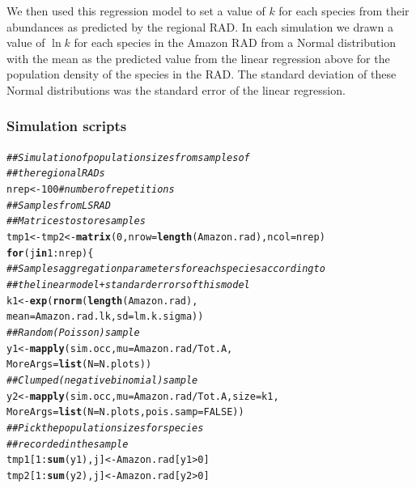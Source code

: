 \documentclass[12pt, A4]{article}\usepackage[]{graphicx}\usepackage[]{color}
\makeatletter
\newcommand{\hlnum}[1]{\textcolor[rgb]{0.686,0.059,0.569}{#1}}%
\newcommand{\hlcom}[1]{\textcolor[rgb]{0.678,0.584,0.686}{\textit{#1}}}%
\newcommand{\hlopt}[1]{\textcolor[rgb]{0,0,0}{#1}}%
\newcommand{\hlstd}[1]{\textcolor[rgb]{0.345,0.345,0.345}{#1}}%
\newcommand{\hlkwa}[1]{\textcolor[rgb]{0.161,0.373,0.58}{\textbf{#1}}}%
\newcommand{\hlkwb}[1]{\textcolor[rgb]{0.69,0.353,0.396}{#1}}%
\newcommand{\hlkwc}[1]{\textcolor[rgb]{0.333,0.667,0.333}{#1}}%
\newcommand{\hlkwd}[1]{\textcolor[rgb]{0.737,0.353,0.396}{\textbf{#1}}}%
\newenvironment{kframe}{%
 \def\at@end@of@kframe{}%
 \ifinner\ifhmode%
  \def\at@end@of@kframe{\end{minipage}}%
  \begin{minipage}{\columnwidth}%
 \fi\fi%
 \def\FrameCommand##1{\hskip\@totalleftmargin \hskip-\fboxsep
 \colorbox{shadecolor}{##1}\hskip-\fboxsep
     \hskip-\linewidth \hskip-\@totalleftmargin \hskip\columnwidth}%
 \MakeFramed {\advance\hsize-\width
   \@totalleftmargin\z@ \linewidth\hsize
   \@setminipage}}%
 {\par\unskip\endMakeFramed%
 \at@end@of@kframe}
\newenvironment{knitrout}{}{} %
\makeatother
\begin{document}
We then used this regression model to set a value of $k$ for each species from
their abundances as predicted by the regional RAD. 
In each simulation we drawn a value of $\ln k$ for each species
in the Amazon RAD from a Normal distribution with the mean as
the predicted value from the linear regression above for the population
density of the species in the RAD. The standard deviation of these
Normal distributions was the standard error of the linear regression.

\subsubsection*{Simulation scripts}

\begin{knitrout}
\color{fgcolor}\begin{kframe}
\begin{alltt}
\hlcom{## Simulation of population sizes from samples of }
\hlcom{## the regional RADs}
\hlstd{nrep} \hlkwb{<-} \hlnum{100} \hlcom{#number of repetitions}
\hlcom{## Samples from LS RAD}
\hlcom{## Matrices to store samples}
\hlstd{tmp1} \hlkwb{<-} \hlstd{tmp2} \hlkwb{<-} \hlkwd{matrix}\hlstd{(}\hlnum{0}\hlstd{,}\hlkwc{nrow}\hlstd{=}\hlkwd{length}\hlstd{(Amazon.rad),} \hlkwc{ncol}\hlstd{=nrep)}
\hlkwa{for}\hlstd{(j} \hlkwa{in} \hlnum{1}\hlopt{:}\hlstd{nrep)\{}
    \hlcom{## Samples aggregation parameters for each species according to }
    \hlcom{## the linear model + standard errors of this model}
    \hlstd{k1} \hlkwb{<-} \hlkwd{exp}\hlstd{(}\hlkwd{rnorm}\hlstd{(}\hlkwd{length}\hlstd{(Amazon.rad),}
                    \hlkwc{mean}\hlstd{=Amazon.rad.lk,} \hlkwc{sd}\hlstd{=lm.k.sigma))}
    \hlcom{## Random (Poisson) sample}
    \hlstd{y1} \hlkwb{<-} \hlkwd{mapply}\hlstd{(sim.occ,} \hlkwc{mu} \hlstd{= Amazon.rad}\hlopt{/}\hlstd{Tot.A,}
                   \hlkwc{MoreArgs}\hlstd{=}\hlkwd{list}\hlstd{(}\hlkwc{N} \hlstd{= N.plots))}
    \hlcom{## Clumped (negative binomial) sample}
    \hlstd{y2} \hlkwb{<-} \hlkwd{mapply}\hlstd{(sim.occ,} \hlkwc{mu} \hlstd{= Amazon.rad}\hlopt{/}\hlstd{Tot.A,} \hlkwc{size} \hlstd{= k1,}
                   \hlkwc{MoreArgs}\hlstd{=}\hlkwd{list}\hlstd{(}\hlkwc{N} \hlstd{= N.plots,} \hlkwc{pois.samp}\hlstd{=}\hlnum{FALSE}\hlstd{))}
    \hlcom{## Pick the population sizes for species}
    \hlcom{## recorded in the sample}
    \hlstd{tmp1[}\hlnum{1}\hlopt{:}\hlkwd{sum}\hlstd{(y1),j]} \hlkwb{<-} \hlstd{Amazon.rad[y1}\hlopt{>}\hlnum{0}\hlstd{]}
    \hlstd{tmp2[}\hlnum{1}\hlopt{:}\hlkwd{sum}\hlstd{(y2),j]} \hlkwb{<-} \hlstd{Amazon.rad[y2}\hlopt{>}\hlnum{0}\hlstd{]}

\end{alltt}
\end{kframe}
\end{knitrout}
\end{document}

